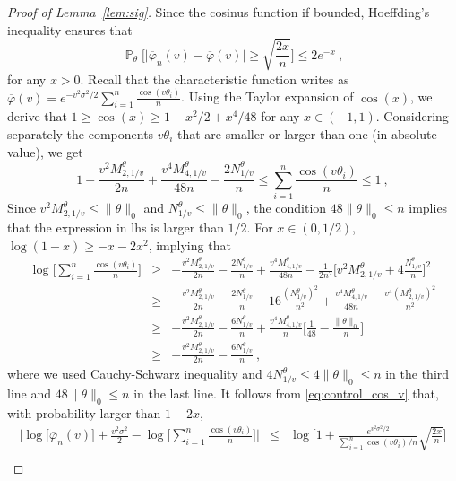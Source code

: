 \documentclass[twoside,11pt]{article}
\def\beq{\begin{equation}}
\def\eeq{\end{equation}}
\renewcommand{\P}{\operatorname{\mathbb{P}}}
\newcommand{\<}{\langle}
\renewcommand{\>}{\rangle}
\begin{document}
\begin{proof}[Proof of Lemma~\ref{lem:sig}]

Since the cosinus function if bounded, Hoeffding's inequality ensures that 
\beq\label{eq:control_cos_v}
\P_{\theta}\Big[\big|\overline{\varphi}_n(v) - \overline{\varphi}(v)\big|\geq  \sqrt{\frac{2x}{n}}\Big]\leq 2e^{-x}\ ,
\eeq
for any $x>0$. Recall that the characteristic function writes as $\overline{\varphi}(v)=e^{-v^2\sigma^2/2} \sum_{i=1}^n \frac{\cos(v\theta_i)}{n}$.
Using the Taylor expansion of $\cos(x)$, we derive that $1\geq \cos(x)\geq 1- x^2/2 + x^{4}/48$ for any $x\in (-1,1)$. Considering separately the components $v \theta_i$ that are smaller or larger than one (in absolute value), we get
\[
1 - \frac{v^2M^{\theta}_{2,1/v}}{2n} +  \frac{v^4M_{4,1/v}^{\theta}}{48 n} -  \frac{2N^{\theta}_{1/v}}{n} \leq \sum_{i=1}^n \frac{\cos(v\theta_i)}{n}   \leq  1 \ ,
\]
Since $v^2M^{\theta}_{2,1/v}\leq \|\theta\|_0$ and $N^{\theta}_{1/v}\leq \|\theta\|_0$, the condition $48\|\theta\|_0\leq n$
implies that the expression in lhs is larger than $1/2$. For $x\in (0,1/2)$, $\log(1-x)\geq -x -2x^2$, implying that
\begin{eqnarray} \nonumber
  \log\big[\sum_{i=1}^n \frac{\cos(v\theta_i)}{n} \big] &\geq & - \frac{v^2M_{2,1/v}^{\theta}}{2n} - \frac{2N_{1/v}^{\theta}}{n} +  \frac{v^4M_{4,1/v}^{\theta}}{48 n} - \frac{1}{2n^2}\Big[ v^2M_{2,1/v}^{\theta} + 4\frac{N_{1/v}^{\theta}}{n} \Big]^2    \\
   &\geq&  - \frac{v^2M_{2,1/v}^{\theta}}{2n} - \frac{2N_{1/v}^{\theta}}{n} -  16 \frac{(N_{1/v}^{\theta})^2}{n^2}+  \frac{v^4M_{4,1/v}^{\theta}}{48 n} -  \frac{v^4(M_{2,1/v}^{\theta})^2}{n^2}     \nonumber \\
   &\geq & - \frac{v^2M_{2,1/v}^{\theta}}{2n} - \frac{6N_{1/v}^{\theta}}{n}  + \frac{v^4M_{4,1/v}^{\theta}}{n}\big[\frac{1}{48}- \frac{\|\theta\|_0}{n}\big] 
   \nonumber\\
   &\geq & - \frac{v^2M_{2,1/v}^{\theta}}{2n} - \frac{6N_{1/v}^{\theta}}{n} 
  \ , \label{eq:upper_cos_v_det}
\end{eqnarray}
where we used Cauchy-Schwarz inequality and $4N_{1/v}^{\theta}\leq 4\|\theta\|_0\leq n$ in the third line and $48\|\theta\|_0\leq n$ in the last line. It follows from \eqref{eq:control_cos_v} that, with probability larger than $1-2x$,
\begin{eqnarray}\nonumber
 \Big|\log\big[\overline{\varphi}_n(v)\big]+ \frac{v^2\sigma^2}{2} - \log\Big[\sum_{i=1}^n \frac{\cos(v\theta_i)}{n}\Big]\Big|&\leq  &\log\Big[1+ \frac{e^{v^2\sigma^2/2}}{\sum_{i=1}^n \cos(v\theta_i)/n}\sqrt{\frac{2x}{n}}\Big]\\ \label{eq:upper_deviation_loss}

\end{eqnarray}
\end{proof}
\end{document}
